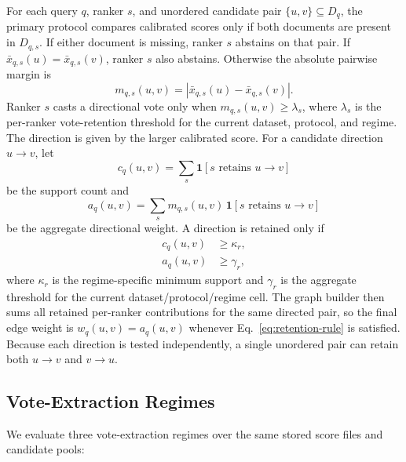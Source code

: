 \documentclass[manuscript,anonymous,review]{acmart}
\begin{document}
For each query $q$, ranker $s$, and unordered candidate pair $\{u,v\}
\subseteq D_q$, the primary protocol compares calibrated scores only if both
documents are present in $D_{q,s}$. If either document is missing, ranker $s$
abstains on that pair. If $\bar{x}_{q,s}(u) = \bar{x}_{q,s}(v)$, ranker $s$
also abstains. Otherwise the absolute pairwise margin is
\begin{equation}
  m_{q,s}(u,v) = \left| \bar{x}_{q,s}(u) - \bar{x}_{q,s}(v) \right|.
  \label{eq:pair-margin}
\end{equation}
Ranker $s$ casts a directional vote only when $m_{q,s}(u,v) \ge \lambda_s$,
where $\lambda_s$ is the per-ranker vote-retention threshold for the current
dataset, protocol, and regime. The direction is given by the larger calibrated
score. For a candidate direction $u \rightarrow v$, let
\begin{equation}
  c_q(u,v) = \sum_{s} \mathbf{1}\!\left[s \text{ retains } u \rightarrow v\right]
  \label{eq:support-count}
\end{equation}
be the support count and
\begin{equation}
  a_q(u,v) = \sum_{s} m_{q,s}(u,v)\,
  \mathbf{1}\!\left[s \text{ retains } u \rightarrow v\right]
  \label{eq:aggregate-weight}
\end{equation}
be the aggregate directional weight. A direction is retained only if
\begin{equation}
  \begin{aligned}
    c_q(u,v) &\ge \kappa_r, \\
    a_q(u,v) &\ge \gamma_r,
  \end{aligned}
  \label{eq:retention-rule}
\end{equation}
where $\kappa_r$ is the regime-specific minimum support and $\gamma_r$ is the
aggregate threshold for the current dataset/protocol/regime cell. The graph
builder then sums all retained per-ranker contributions for the same directed
pair, so the final edge weight is $w_q(u,v)=a_q(u,v)$ whenever
Eq.~\eqref{eq:retention-rule} is satisfied. Because each direction is tested
independently, a single unordered pair can retain both $u \rightarrow v$ and
$v \rightarrow u$.

\subsection{Vote-Extraction Regimes}
\label{sec:regimes}

We evaluate three vote-extraction regimes over the same stored score files and
candidate pools:
\end{document}
